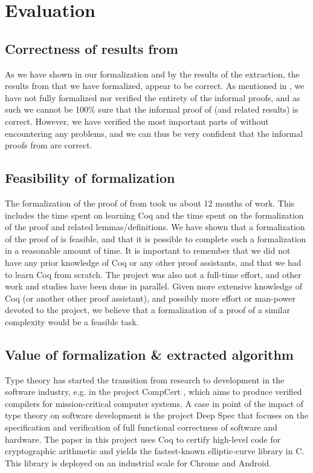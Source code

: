 \chapter{Evaluation}

\section{Correctness of results from \cite{mbezem}}

As we have shown in our formalization and by the results of the
extraction, the results from \cite{mbezem} that we have formalized, appear to be correct.
As mentioned in , we have not fully formalized nor verified the entirety of the informal proofs,
and as such we cannot be 100\% sure that the informal proof of  (and related results) is correct.
However, we have verified the most important parts of  without
encountering any problems, and we can thus be very confident that the informal proofs from \cite{mbezem} are correct.

\section{Feasibility of formalization}
\label{sec:feasibility_of_formalization}

The formalization of the proof of  from \cite{mbezem} took us about 12 months of work.
This includes the time spent on learning Coq and the time spent on the formalization of the proof
and related lemmas/definitions.
We have shown that a formalization of the proof of  is feasible,
and that it is possible to complete such a formalization in a reasonable amount of time.
It is important to remember that we did not have any prior knowledge of Coq or any other proof assistants,
and that we had to learn Coq from scratch.
The project was also not a full-time effort, and other work and studies have been done in parallel.
Given more extensive knowledge of Coq (or another other proof assistant),
and possibly more effort or man-power devoted to the project,
we believe that a formalization of a proof of a similar complexity would be a feasible task.

\section{Value of formalization \& extracted algorithm}

Type theory has started the transition from research to development in
the software industry, e.g. in the project CompCert \cite{compcert},
which aims to produce verified compilers for mission-critical computer systems.
A case in point of the impact of type theory on software development is the project Deep Spec
\cite{deepspec} that focuses on the specification and verification of full functional
correctness of software and hardware. The paper \cite{secpriv} in this project uses Coq to certify high-level
code for cryptographic arithmetic and yields the fastest-known elliptic-curve library in C.
This library is deployed on an industrial scale for Chrome and Android.

